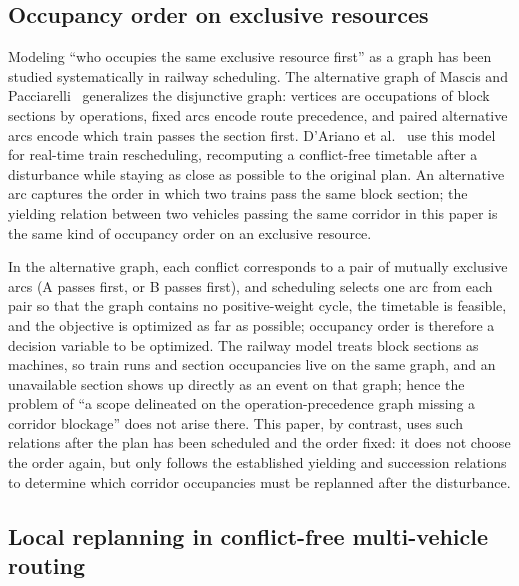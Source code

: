 \documentclass[manuscript,screen,review]{acmart}
\begin{document}
\subsection{Occupancy order on exclusive resources}
\label{sec:rw_ag}

Modeling ``who occupies the same exclusive resource first'' as a graph has been studied systematically in railway scheduling.
The alternative graph of Mascis and Pacciarelli~\cite{mascis2002alternative}
generalizes the disjunctive graph: vertices are occupations of block sections by operations, fixed arcs encode route precedence,
and paired alternative arcs encode which train passes the section first.
D'Ariano et al.~\cite{dariano2007branch} use this model for real-time train rescheduling,
recomputing a conflict-free timetable after a disturbance while staying as close as possible to the original plan.
An alternative arc captures the order in which two trains pass the same block section;
the yielding relation between two vehicles passing the same corridor in this paper is the same kind of occupancy order on an exclusive resource.

In the alternative graph, each conflict corresponds to a pair of mutually exclusive arcs (A passes first, or B passes first),
and scheduling selects one arc from each pair so that the graph contains no positive-weight cycle, the timetable is feasible, and the objective is optimized as far as possible;
occupancy order is therefore a decision variable to be optimized.
The railway model treats block sections as machines, so train runs and section occupancies live on the same graph,
and an unavailable section shows up directly as an event on that graph; hence the problem of ``a scope delineated on the operation-precedence graph missing a corridor blockage'' does not arise there.
This paper, by contrast, uses such relations after the plan has been scheduled and the order fixed: it does not choose the order again,
but only follows the established yielding and succession relations to determine which corridor occupancies must be replanned after the disturbance.

\subsection{Local replanning in conflict-free multi-vehicle routing}
\label{sec:rw_mapf}
\end{document}
